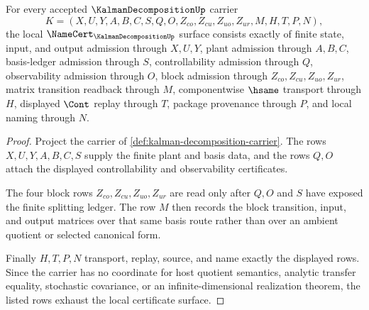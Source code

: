 \begin{theorem}
\label{thm:kalman-decomposition-namecert-obligations}
For every accepted $\KalmanDecompositionUp$ carrier
$$
K=(X,U,Y,A,B,C,S,Q,O,Z_{co},Z_{cu},Z_{uo},Z_{ur},M,H,T,P,N),
$$
the local $\NameCert_{\KalmanDecompositionUp}$ surface consists exactly of finite state, input, and output admission through $X,U,Y$, plant admission through $A,B,C$, basis-ledger admission through $S$, controllability admission through $Q$, observability admission through $O$, block admission through $Z_{co},Z_{cu},Z_{uo},Z_{ur}$, matrix transition readback through $M$, componentwise $\hsame$ transport through $H$, displayed $\Cont$ replay through $T$, package provenance through $P$, and local naming through $N$.
\end{theorem}
\begin{proof}
Project the carrier of \autoref{def:kalman-decomposition-carrier}. The rows $X,U,Y,A,B,C,S$ supply the finite plant and basis data, and the rows $Q,O$ attach the displayed controllability and observability certificates.

The four block rows $Z_{co},Z_{cu},Z_{uo},Z_{ur}$ are read only after $Q,O$ and $S$ have exposed the finite splitting ledger. The row $M$ then records the block transition, input, and output matrices over that same basis route rather than over an ambient quotient or selected canonical form.

Finally $H,T,P,N$ transport, replay, source, and name exactly the displayed rows. Since the carrier has no coordinate for host quotient semantics, analytic transfer equality, stochastic covariance, or an infinite-dimensional realization theorem, the listed rows exhaust the local certificate surface.
\end{proof}

